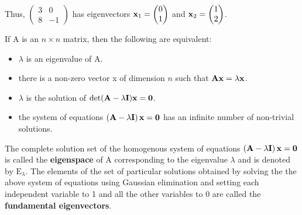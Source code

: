 Thus, $\begin{pmatrix} 3&0\\8&-1\end{pmatrix}$ has eigenvectors $\mathbf{x}_1
= \begin{pmatrix} 0\\1 \end{pmatrix}$ and $\mathbf{x}_2=
\begin{pmatrix}1\\2\end{pmatrix}$.

\begin{theorem}
  If \matri A is an $n \times n$ matrix, then the following are equivalent: 
  \begin{itemize}
    \item $\lambda$ is an eigenvalue of \matri A.
    \item there is a non-zero vector \matri x of dimension $n$ such that $\mathbf{Ax} = \lambda\mathbf{x}$. 
    \item $\lambda$ is the solution of $\det(\mathbf{A} - \lambda\mathbf{I})\mathbf{x} = \mathbf{0}$.
    \item the system of equations $\left( \mathbf{A} - \lambda\mathbf{I} \right)\mathbf{x} = \mathbf{0} $ has an infinite number of non-trivial solutions.
  \end{itemize}
\end{theorem}

\begin{note}
  The complete solution set of the homogenous system of equations $\left( \mathbf{A} - \lambda\mathbf{I} \right)\mathbf{x} = \mathbf{0}$ is called the
  \textbf{eigenspace} of \matri A corresponding to the eigenvalue $\lambda$ and
  is denoted by $\mathrm E_\lambda$. The elements of the set of particular
  solutions obtained by solving the the above system of equations using
  Gaussian elimination and setting each independent variable to 1 and all the
  other variables to 0 are called the \textbf{fundamental eigenvectors}. 
\end{note}

